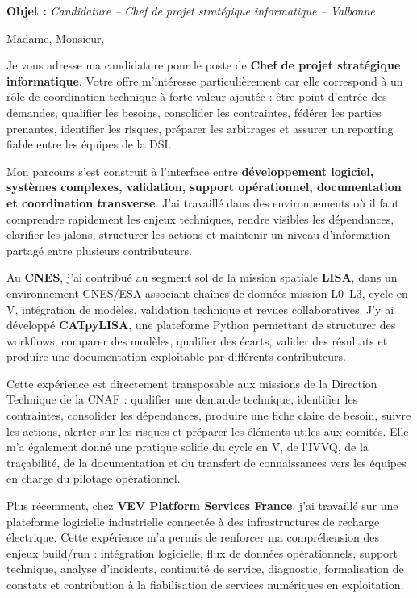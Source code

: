 \documentclass[11pt,a4paper]{altacv}
\begin{document}
\makecvheader
\vspace{-0.6cm}

\vspace{-0.4cm}

{\color{accent}\textbf{Objet :}} \textit{Candidature -- Chef de projet stratégique informatique -- Valbonne}

{\color{body}

Madame, Monsieur,

Je vous adresse ma candidature pour le poste de \textbf{Chef de projet stratégique informatique}. Votre offre m'intéresse particulièrement car elle correspond à un rôle de coordination technique à forte valeur ajoutée : être point d'entrée des demandes, qualifier les besoins, consolider les contraintes, fédérer les parties prenantes, identifier les risques, préparer les arbitrages et assurer un reporting fiable entre les équipes de la DSI.

Mon parcours s'est construit à l'interface entre \textbf{développement logiciel, systèmes complexes, validation, support opérationnel, documentation et coordination transverse}. J'ai travaillé dans des environnements où il faut comprendre rapidement les enjeux techniques, rendre visibles les dépendances, clarifier les jalons, structurer les actions et maintenir un niveau d'information partagé entre plusieurs contributeurs.

Au \textbf{CNES}, j'ai contribué au segment sol de la mission spatiale \textbf{LISA}, dans un environnement CNES/ESA associant chaînes de données mission L0--L3, cycle en V, intégration de modèles, validation technique et revues collaboratives. J'y ai développé \textbf{CATpyLISA}, une plateforme Python permettant de structurer des workflows, comparer des modèles, qualifier des écarts, valider des résultats et produire une documentation exploitable par différents contributeurs.

Cette expérience est directement transposable aux missions de la Direction Technique de la CNAF : qualifier une demande technique, identifier les contraintes, consolider les dépendances, produire une fiche claire de besoin, suivre les actions, alerter sur les risques et préparer les éléments utiles aux comités. Elle m'a également donné une pratique solide du cycle en V, de l'IVVQ, de la traçabilité, de la documentation et du transfert de connaissances vers les équipes en charge du pilotage opérationnel.

Plus récemment, chez \textbf{VEV Platform Services France}, j'ai travaillé sur une plateforme logicielle industrielle connectée à des infrastructures de recharge électrique. Cette expérience m'a permis de renforcer ma compréhension des enjeux build/run : intégration logicielle, flux de données opérationnels, support technique, analyse d'incidents, continuité de service, diagnostic, formalisation de constats et contribution à la fiabilisation de services numériques en exploitation.

}
\end{document}
